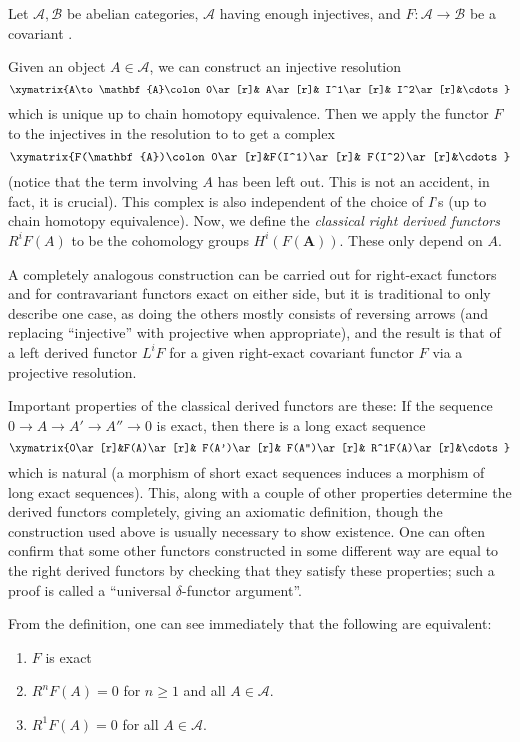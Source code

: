 \documentclass[12pt]{article}
\renewcommand{\EuScript}[1]{\mathcal{#1}}
\newcommand{\ES}[1]{\EuScript{#1}}
\begin{document}
Let $\ES{A},\ES{B}$ be abelian categories, $\ES{A}$ having enough injectives, and $F:\ES{A}\to\ES{B}$
be a covariant .  
  
Given an object $A\in \ES{A}$, we can construct an injective resolution
$$\xymatrix{A\to \mathbf{A}\colon 0\ar[r]& A\ar[r]& I^1\ar[r]& I^2\ar[r]&\cdots}$$
which is unique up to chain homotopy equivalence.  Then we apply the functor 
$F$ to the injectives in the resolution to to get a complex
$$\xymatrix{F(\mathbf{A})\colon 0\ar[r]&F(I^1)\ar[r]& F(I^2)\ar[r]&\cdots}$$
(notice that the term involving $A$ has been left out.  This is not an accident, 
in fact, it is crucial). This complex is also independent of the choice of $I$'s 
(up to chain homotopy equivalence).  Now, we define the \emph{classical right 
derived functors} $R^iF(A)$ to be the cohomology groups $H^i(F(\mathbf{A}))$.
These only depend on $A$.

A completely analogous construction can be carried out for right-exact functors and for contravariant functors exact on either side, but it is traditional to only describe one case, as doing the others mostly consists of reversing arrows (and replacing ``injective'' with projective when appropriate), and the result is that of a left derived functor $L^iF$ for a given right-exact covariant functor $F$ via a projective resolution.

Important properties of the classical derived functors are these: 
If the sequence $0\to A\to A'\to A''\to 0$ is exact, then there
is a long exact sequence 
$$\xymatrix{0\ar[r]&F(A)\ar[r]& F(A')\ar[r]& F(A'')\ar[r]& R^1F(A)\ar[r]&\cdots}$$
which is natural (a morphism of short exact sequences induces a morphism
of long exact sequences).  This, along with a couple of other properties 
determine the derived functors completely, giving an axiomatic definition,
though the construction used above is usually necessary to show existence.  One can often confirm that some other functors constructed in some different way are equal to the right derived functors by checking that they satisfy these properties; such a proof is called a ``universal $\delta$-functor argument''.   

From the definition, one can see immediately that the following are equivalent:
\begin{enumerate}
\item $F$ is exact 
\item $R^nF(A)=0$ for $n\geq 1$ and all $A\in \ES{A}$.
\item $R^1F(A)=0$ for all $A\in \ES{A}$.
\end{enumerate}
\end{document}
